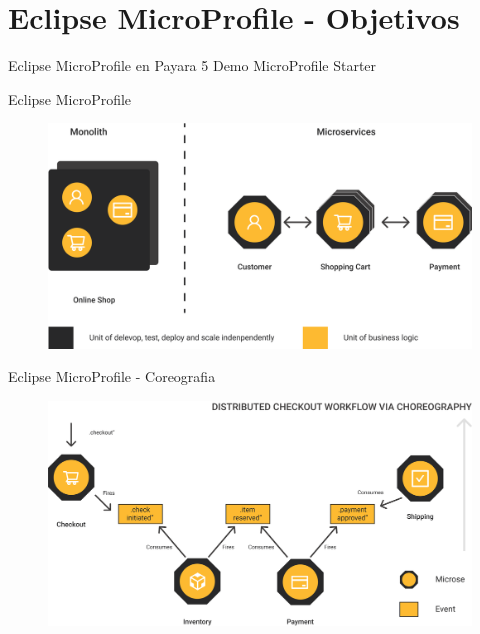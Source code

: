 \documentclass[aspectratio=169]{beamer}
\begin{document}
{
    \section{Eclipse MicroProfile - Objetivos}
}

\begin{frame}[fragile]{Eclipse MicroProfile en Payara 5}
\LARGE Demo MicroProfile Starter
\end{frame}

\begin{frame}{Eclipse MicroProfile}
\begin{figure}
	\centering
	\includegraphics[width=0.8\linewidth]{Images/mp0}
\end{figure}
\end{frame}

\begin{frame}{Eclipse MicroProfile - Coreografia}
\begin{figure}
	\centering
	\includegraphics[width=0.8\linewidth]{Images/mpcore}
\end{figure}
\end{frame}
\end{document}
